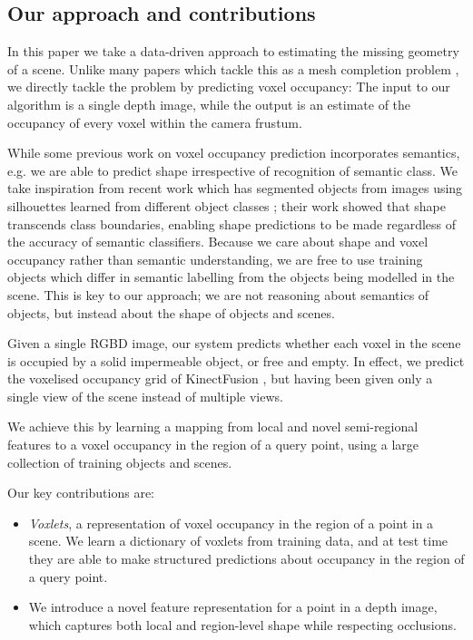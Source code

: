 \documentclass[10pt,twocolumn,letterpaper]{article}
\makeatletter
\renewcommand*{\eg}{e.g.\@\xspace}
\makeatother
\begin{document}
\subsection{Our approach and contributions}

In this paper we take a data-driven approach to estimating the missing geometry of a scene.
Unlike many papers which tackle this as a mesh completion problem \cite{schnabel-eurographics-2009, ju-cst-2009, silberman-eccv-2014}, we directly tackle the problem by predicting voxel occupancy:
The input to our algorithm is a single depth image, while the output is an estimate of the occupancy of every voxel within the camera frustum.

While some previous work on voxel occupancy prediction incorporates semantics, \eg \cite{kim-iccv-2013, shen-tog-2012, cocias-cgvcv-2013} we are able to predict shape irrespective of recognition of semantic class.
We take inspiration from recent work which has segmented objects from images using silhouettes learned from different object classes \cite{kim-eccv-2012};
their work showed that shape transcends class boundaries, enabling shape predictions to be made regardless of the accuracy of semantic classifiers.
Because we care about shape and voxel occupancy rather than semantic understanding, we are free to use training objects which differ in semantic labelling from the objects being modelled in the scene.
This is key to our approach; we are not reasoning about semantics of objects, but instead about the shape of objects and scenes.

Given a single RGBD image, our system predicts whether each voxel in the scene is occupied by a solid impermeable object, or free and empty. 
In effect, we predict the voxelised occupancy grid of KinectFusion \cite{izadi-uist-2011}, but having been given only a single view of the scene instead of multiple views.

We achieve this by learning a mapping from local and novel semi-regional features to a voxel occupancy in the region of a query point, using a large collection of training objects and scenes.

Our key contributions are:

\begin{itemize}
\item \emph{Voxlets}, a representation of voxel occupancy in the region of a point in a scene. We learn a dictionary of voxlets from training data, and at test time they are able to make structured predictions about occupancy in the region of a query point.
\item We introduce a novel feature representation for a point in a depth image, which captures both local and region-level shape while respecting occlusions.
\end{itemize}
\end{document}
